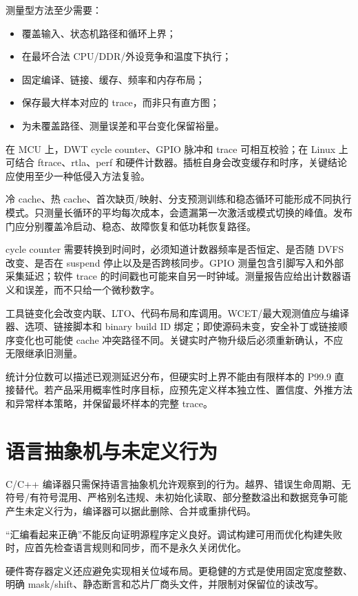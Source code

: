 测量型方法至少需要：
\begin{itemize}
  \item 覆盖输入、状态机路径和循环上界；
  \item 在最坏合法 CPU/DDR/外设竞争和温度下执行；
  \item 固定编译、链接、缓存、频率和内存布局；
  \item 保存最大样本对应的 trace，而非只有直方图；
  \item 为未覆盖路径、测量误差和平台变化保留裕量。
\end{itemize}

在 MCU 上，DWT cycle counter、GPIO 脉冲和 trace 可相互校验；在 Linux 上可结合 ftrace、rtla、perf 和硬件计数器。插桩自身会改变缓存和时序，关键结论应使用至少一种低侵入方法复验。

冷 cache、热 cache、首次缺页/映射、分支预测训练和稳态循环可能形成不同执行模式。只测量长循环的平均每次成本，会遗漏第一次激活或模式切换的峰值。发布门应分别覆盖冷启动、稳态、故障恢复和低功耗恢复路径。

cycle counter 需要转换到时间时，必须知道计数器频率是否恒定、是否随 DVFS 改变、是否在 suspend 停止以及是否跨核同步。GPIO 测量包含引脚写入和外部采集延迟；软件 trace 的时间戳也可能来自另一时钟域。测量报告应给出计数器语义和误差，而不只给一个微秒数字。

工具链变化会改变内联、LTO、代码布局和库调用。WCET/最大观测值应与编译器、选项、链接脚本和 binary build ID 绑定；即使源码未变，安全补丁或链接顺序变化也可能使 cache 冲突路径不同。关键实时产物升级后必须重新确认，不应无限继承旧测量。

统计分位数可以描述已观测延迟分布，但硬实时上界不能由有限样本的 P99.9 直接替代。若产品采用概率性时序目标，应预先定义样本独立性、置信度、外推方法和异常样本策略，并保留最坏样本的完整 trace。

\section{语言抽象机与未定义行为}

C/C++ 编译器只需保持语言抽象机允许观察到的行为。越界、错误生命周期、无符号/有符号混用、严格别名违规、未初始化读取、部分整数溢出和数据竞争可能产生未定义行为，编译器可以据此删除、合并或重排代码。

“汇编看起来正确”不能反向证明源程序定义良好。调试构建可用而优化构建失败时，应首先检查语言规则和同步，而不是永久关闭优化。

硬件寄存器定义还应避免实现相关位域布局。更稳健的方式是使用固定宽度整数、明确 mask/shift、静态断言和芯片厂商头文件，并限制对保留位的读改写。

